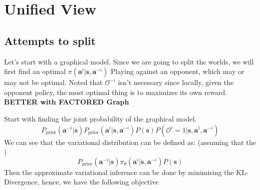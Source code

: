 \section{Unified View}
\subsection{Attempts to split}
Let's start with a graphical model. Since we are going to split the worlds, we will first find an optimal $\pi(\boldsymbol{a}^i | \boldsymbol{s}, \boldsymbol{a}^{-i})$ Playing against an opponent, which may or may not be optimal. Noted that $\mathcal{O}^{-i}$ isn't necessary since locally, given the opponent policy, the most optimal thing is to maximizes its own reward.
\textbf{BETTER with FACTORED Graph}

\begin{figure}[t]
    \begin{minipage}[t]{0.5\linewidth}
    \centering
    \end{minipage}%
    \begin{minipage}[t]{0.5\linewidth}
    \end{minipage}
\end{figure}
Start with finding the joint probability of the graphical model.
\begin{equation}
    P_{\text{prior}}(\boldsymbol{a}^{-i} | \boldsymbol{s}) P_{\text{prior}}(\boldsymbol{a}^i | \boldsymbol{s}, \boldsymbol{a}^{-i}) P(\boldsymbol{s}) P(\mathcal{O}^i = 1 | \boldsymbol{s}, \boldsymbol{a}^i, \boldsymbol{a}^{-i})
\end{equation}
We can see that the variational distribution can be defined as: (assuming that the )
\begin{equation}
    P_{\text{prior}}(\boldsymbol{a}^{-i} | \boldsymbol{s}) \pi_{\theta}(\boldsymbol{a}^{i} | \boldsymbol{s}, \boldsymbol{a}^{-i}) P(\boldsymbol{s})
\end{equation}
Then the approximate variational inference can be done by minimising the KL-Divergence, hence, we have the following objective 

